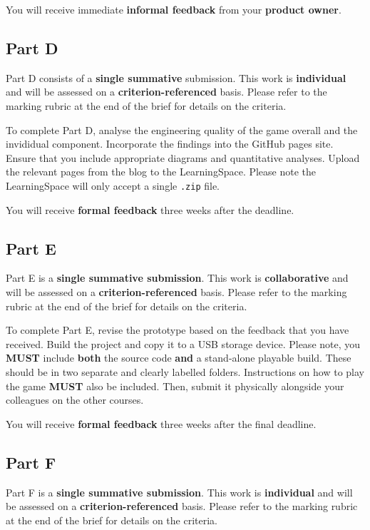 \documentclass{../../fal_assignment}
\begin{document}
You will receive immediate \textbf{informal feedback} from your \textbf{product owner}.

\subsection*{Part D}

Part D consists of a \textbf{single summative} submission. This work is \textbf{individual} and will be assessed on a \textbf{criterion-referenced} basis. Please refer to the marking rubric at the end of the brief for details on the criteria.

To complete Part D, analyse the engineering quality of the game overall and the invididual component. Incorporate the findings into the GitHub pages site. Ensure that you include appropriate diagrams and quantitative analyses. Upload the relevant pages from the blog to the LearningSpace. Please note the LearningSpace will only accept a single \texttt{.zip} file. 

You will receive \textbf{formal feedback} three weeks after the deadline.

\subsection*{Part E}

Part E is a \textbf{single summative submission}. This work is \textbf{collaborative} and will be assessed on a \textbf{criterion-referenced} basis. Please refer to the marking rubric at the end of the brief for details on the criteria.

To complete Part E, revise the prototype based on the feedback that you have received. Build the project and copy it to a USB storage device. Please note, you \textbf{MUST} include \textbf{both} the source code \textbf{and} a stand-alone playable build. These should be in two separate and clearly labelled folders. Instructions on how to play the game \textbf{MUST} also be included. Then, submit it physically alongside your colleagues on the other courses.

You will receive \textbf{formal feedback} three weeks after the final deadline.

\subsection*{Part F}

Part F is a \textbf{single summative submission}. This work is \textbf{individual} and will be assessed on a \textbf{criterion-referenced} basis. Please refer to the marking rubric at the end of the brief for details on the criteria.
\end{document}
